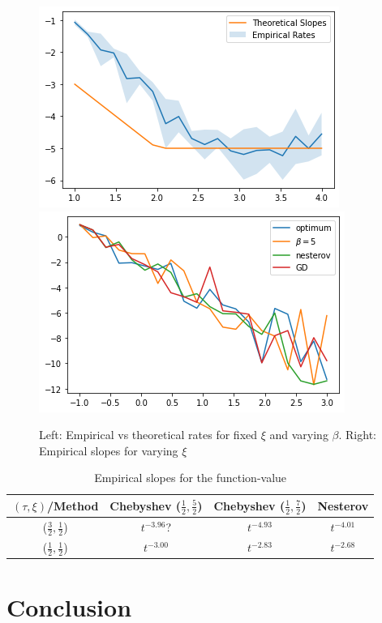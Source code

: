 \documentclass{article}
\begin{document}
\begin{figure}[H]
    \centering
    \includegraphics[width=5 cm]{imgs/theo vs practic.png}\includegraphics[width= 5 cm]{imgs/slopes.png}
    
    
    \caption{Left: Empirical vs theoretical rates for fixed $\xi$ and varying $\beta$. Right: Empirical slopes for varying $\xi$}
    \label{fig:my_label}
\end{figure}

\begin{table}[H]
    \centering
    \begin{tabular}{c|c|c|c}
         $(\tau,\xi)$/Method& Chebyshev ($\frac{1}{2},\frac{5}{2}$) & Chebyshev ($\frac{1}{2},\frac{7}{2}$) &  Nesterov  \\
         \hline
         ($\frac{3}{2},\frac{1}{2}$)&$t^{-3.96}$? & $t^{-4.93}$ & $t^{-4.01}$\\
         \hline
         ($\frac{1}{2},\frac{1}{2}$)&$t^{-3.00}$ & $t^{-2.83}$ & $t^{-2.68}$
         
    \end{tabular}
    \caption{Empirical slopes for the function-value }
    \label{tab:experimental rates}
\end{table}


\section{Conclusion}



\appendix
\newpage
\end{document}
